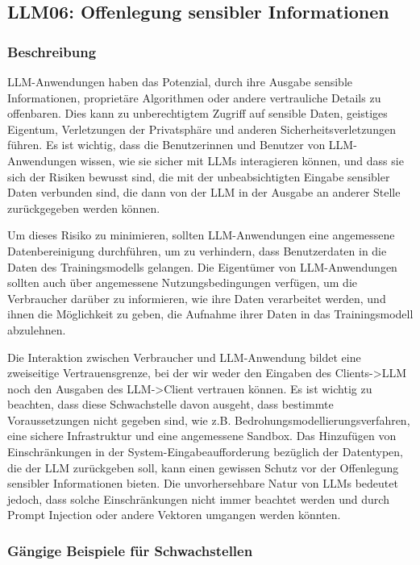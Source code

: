\documentclass[
]{article}
\author{}
\date{}
\begin{document}
\subsection{LLM06: Offenlegung sensibler
Informationen}\label{llm06-offenlegung-sensibler-informationen}

\subsubsection{Beschreibung}\label{beschreibung}

LLM-Anwendungen haben das Potenzial, durch ihre Ausgabe sensible
Informationen, proprietäre Algorithmen oder andere vertrauliche Details
zu offenbaren. Dies kann zu unberechtigtem Zugriff auf sensible Daten,
geistiges Eigentum, Verletzungen der Privatsphäre und anderen
Sicherheitsverletzungen führen. Es ist wichtig, dass die Benutzerinnen
und Benutzer von LLM-Anwendungen wissen, wie sie sicher mit LLMs
interagieren können, und dass sie sich der Risiken bewusst sind, die mit
der unbeabsichtigten Eingabe sensibler Daten verbunden sind, die dann
von der LLM in der Ausgabe an anderer Stelle zurückgegeben werden
können.

Um dieses Risiko zu minimieren, sollten LLM-Anwendungen eine angemessene
Datenbereinigung durchführen, um zu verhindern, dass Benutzerdaten in
die Daten des Trainingsmodells gelangen. Die Eigentümer von
LLM-Anwendungen sollten auch über angemessene Nutzungsbedingungen
verfügen, um die Verbraucher darüber zu informieren, wie ihre Daten
verarbeitet werden, und ihnen die Möglichkeit zu geben, die Aufnahme
ihrer Daten in das Trainingsmodell abzulehnen.

Die Interaktion zwischen Verbraucher und LLM-Anwendung bildet eine
zweiseitige Vertrauensgrenze, bei der wir weder den Eingaben des
Clients-\textgreater LLM noch den Ausgaben des LLM-\textgreater Client
vertrauen können. Es ist wichtig zu beachten, dass diese Schwachstelle
davon ausgeht, dass bestimmte Voraussetzungen nicht gegeben sind, wie
z.B. Bedrohungsmodellierungsverfahren, eine sichere Infrastruktur und
eine angemessene Sandbox. Das Hinzufügen von Einschränkungen in der
System-Eingabeaufforderung bezüglich der Datentypen, die der LLM
zurückgeben soll, kann einen gewissen Schutz vor der Offenlegung
sensibler Informationen bieten. Die unvorhersehbare Natur von LLMs
bedeutet jedoch, dass solche Einschränkungen nicht immer beachtet werden
und durch Prompt Injection oder andere Vektoren umgangen werden könnten.

\subsubsection{Gängige Beispiele für
Schwachstellen}\label{guxe4ngige-beispiele-fuxfcr-schwachstellen}
\end{document}
